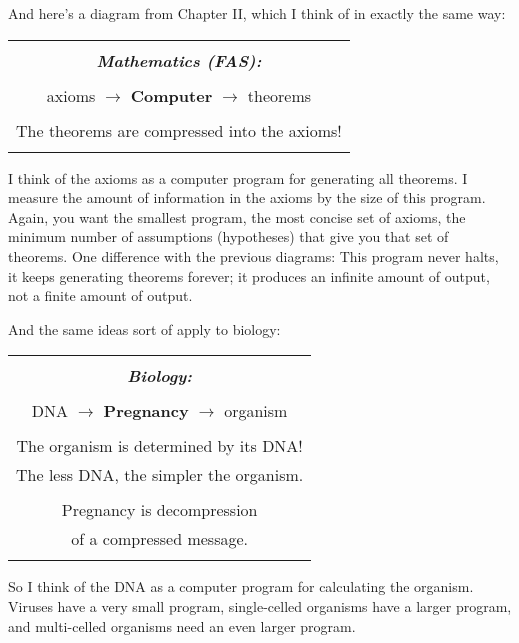 \documentclass[12pt]{book}
\begin{document}
And here's a diagram from Chapter II, which I think of
in exactly the same way:
 
\begin{center}
\begin{tabular}{|c|}
\hline
\\
\textbf{\emph{\large Mathematics (FAS):}}
\\ \\
axioms $\longrightarrow$ \textbf{\large Computer} $\longrightarrow$ theorems
\\ \\
The theorems are compressed into the axioms!
\\
\\
\hline
\end{tabular}
\end{center}
 
I think of the axioms as a computer program for generating all theorems.
I measure the amount of information in the axioms by the size of this program.
Again, you want the smallest program, the most concise set of axioms,
the minimum number of assumptions (hypotheses) that give you that set of theorems.
One difference with the previous diagrams:  This program never halts, it keeps
generating theorems forever; it produces an infinite amount of output, not a finite
amount of output.
 
And the same ideas sort of apply to biology:
 
\begin{center}
\begin{tabular}{|c|}
\hline
\\
\textbf{\emph{\large Biology:}}
\\ \\
DNA $\longrightarrow$ \textbf{\large Pregnancy} $\longrightarrow$ organism
\\ \\
The organism is determined by its DNA!
\\
The less DNA, the simpler the organism.
\\ \\
Pregnancy is decompression 
\\
of a compressed message.
\\
\\
\hline
\end{tabular}
\end{center}
 
So I think of the DNA as a computer program for calculating the organism.
Viruses have a very small program, single-celled organisms have a larger program,
and multi-celled organisms need an even larger program.
\end{document}
